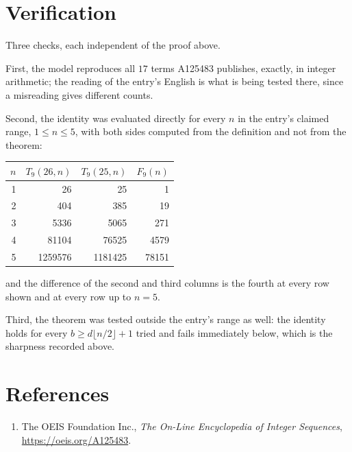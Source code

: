 \documentclass[11pt,a4paper]{article}
\theoremstyle{plain}
\theoremstyle{definition}
\begin{document}
\section{Verification}

Three checks, each independent of the proof above.

First, the model reproduces all $17$ terms A125483 publishes, exactly, in integer
arithmetic; the reading of the entry's English is what is being tested there, since a
misreading gives different counts.

Second, the identity was evaluated directly for every $n$ in the entry's claimed range,
$1\le n\le5$, with both sides computed from the definition and not from the theorem:

\begin{center}
\begin{tabular}{rrrr}
$n$ & $T_{9}(26,n)$ & $T_{9}(25,n)$ & $F_{9}(n)$ \\ \hline
1 & 26 & 25 & 1 \\
2 & 404 & 385 & 19 \\
3 & 5336 & 5065 & 271 \\
4 & 81104 & 76525 & 4579 \\
5 & 1259576 & 1181425 & 78151 \\
\end{tabular}
\end{center}

\noindent and the difference of the second and third columns is the fourth at every row shown
and at every row up to $n=5$.

Third, the theorem was tested outside the entry's range as well: the identity holds for every
$b\ge d\lfloor n/2\rfloor+1$ tried and fails immediately below, which is the sharpness recorded
above.

\section*{References}
\begin{enumerate}
\item The OEIS Foundation Inc., \emph{The On-Line Encyclopedia of Integer Sequences},
\url{https://oeis.org/A125483}.
\end{enumerate}
\end{document}
